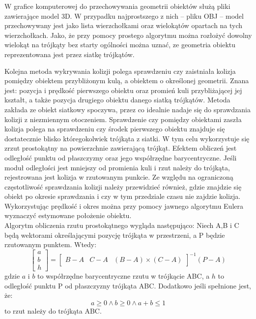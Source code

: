 W grafice komputerowej do przechowywania geometrii obiektów służą pliki zawierające model 3D. W przypadku najprostszego z nich -- pliku OBJ -- model przechowywany jest jako lista wierzchołkami oraz wielokątów opartach na tych wierzchołkach. Jako, że przy pomocy prostego algorytmu można rozłożyć dowolny wielokąt na trójkąty bez starty ogólności można uznać, ze geometria obiektu reprezentowana jest przez siatkę trójkątów.

Kolejna metoda wykrywania kolizji polega sprawdzeniu czy zaistniała kolizja pomiędzy obiektem przybliżonym kulą, a obiektem o określonej geometrii. Znana jest: pozycja i prędkość pierwszego obiektu oraz promień kuli przybliżającej jej kształt, a także pozycja drugiego obiektu danego siatką trójkątów. Metoda zakłada ze obiekt siatkowy spoczywa, przez co idealnie nadaje się do sprawdzania kolizji z niezmiennym otoczeniem. Sprawdzenie czy pomiędzy obiektami zaszła kolizja polega na sprawdzeniu czy środek pierwszego obiektu znajduje się dostatecznie blisko któregokolwiek trójkąta z siatki. W tym celu wykorzystuje się zrzut prostokątny na powierzchnie zawierającą trójkąt. Efektem obliczeń jest odległość punktu od płaszczyzny oraz jego współrzędne barycentryczne. Jeśli moduł odległości jest mniejszy od promienia kuli i rzut należy do trójkąta, rejestrowana jest kolizja w rzutowanym punkcie. Ze względu na ograniczoną częstotliwość sprawdzania kolizji należy przewidzieć również, gdzie znajdzie się obiekt po okresie sprawdzania i czy w tym przedziale czasu nie zajdzie kolizja. Wykorzystując prędkość i okres można przy pomocy jawnego algorytmu Eulera wyznaczyć estymowane położenie obiektu.\\

Algorytm obliczenia rzutu prostokątnego wygląda następująco: Niech A,B i C będą wektorami określającymi pozycję trójkąta w przestrzeni, a P będzie rzutowanym punktem. Wtedy:
\[
	\begin{bmatrix}
	a \\ b \\ h
	\end{bmatrix}
	=
	\begin{bmatrix}
	B - A & C - A & (B - A) \times (C - A)
	\end{bmatrix}^{-1} \left( P - A \right)
\]
gdzie $a$ i $b$ to współrzędne barycentryczne rzutu w trójkącie ABC, a $h$ to odległość punktu P od płaszczyzny trójkąta ABC. Dodatkowo jeśli spełnione jest, że:
\[
a \geq 0 \land b \geq 0 \land a + b \leq 1
\]
to rzut należy do trójkąta ABC.\\

